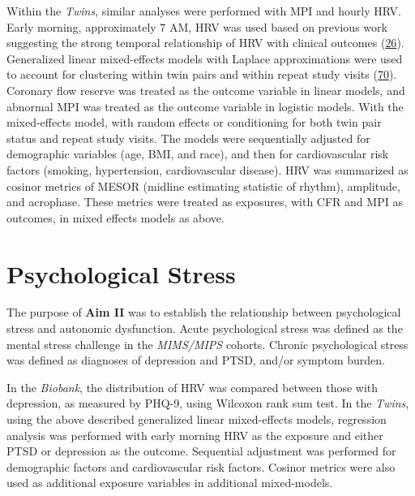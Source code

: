 \documentclass[
  11pt,
  openany]{book}
\begin{document}
Within the \emph{Twins}, similar analyses were performed with MPI and hourly HRV. Early morning, approximately 7 AM, HRV was used based on previous work suggesting the strong temporal relationship of HRV with clinical outcomes (\protect\hyperlink{ref-Shah2020}{26}).
Generalized linear mixed-effects models with Laplace approximations were used to account for clustering within twin pairs and within repeat study visits (\protect\hyperlink{ref-Carlin2005a}{70}).
Coronary flow reserve was treated as the outcome variable in linear models, and abnormal MPI was treated as the outcome variable in logistic models.
With the mixed-effects model, with random effects or conditioning for both twin pair status and repeat study visits.
The models were sequentially adjusted for demographic variables (age, BMI, and race), and then for cardiovascular risk factors (smoking, hypertension, cardiovascular disease).
HRV was summarized as cosinor metrics of MESOR (midline estimating statistic of rhythm), amplitude, and acrophase.
These metrics were treated as exposures, with CFR and MPI as outcomes, in mixed effects models as above.

\hypertarget{psychological-stress}{%
\section{Psychological Stress}\label{psychological-stress}}

The purpose of \textbf{Aim II} was to establish the relationship between psychological stress and autonomic dysfunction.
Acute psychological stress was defined as the mental stress challenge in the \emph{MIMS/MIPS} cohorts. Chronic psychological stress was defined as diagnoses of depression and PTSD, and/or symptom burden.

In the \emph{Biobank}, the distribution of HRV was compared between those with depression, as measured by PHQ-9, using Wilcoxon rank sum test.
In the \emph{Twins}, using the above described generalized linear mixed-effects models, regression analysis was performed with early morning HRV as the exposure and either PTSD or depression as the outcome.
Sequential adjustment was performed for demographic factors and cardiovascular risk factors.
Cosinor metrics were also used as additional exposure variables in additional mixed-models.
\end{document}
